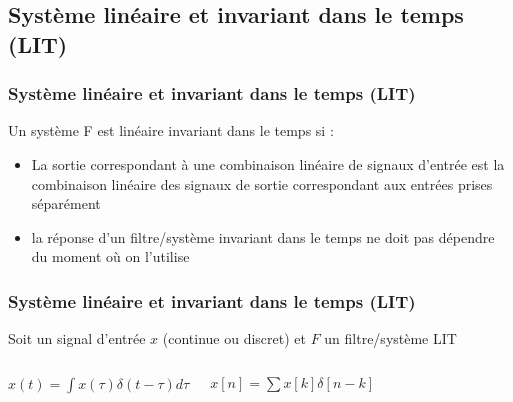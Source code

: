 \documentclass{beamer}
\begin{document}
\subsection{Système linéaire et invariant dans le  temps (LIT)}

\begin{frame}
\frametitle{Système linéaire et invariant dans le  temps (LIT) }

Un système F est linéaire invariant dans le temps si :
\begin{itemize}
\item La sortie correspondant à une combinaison linéaire de signaux d'entrée est la combinaison linéaire des signaux de sortie correspondant aux entrées prises séparément\\
\item la réponse d'un filtre/système invariant dans le temps ne doit pas dépendre du moment où on l'utilise\\
\end{itemize}

\end{frame} 

\begin{frame} 
\frametitle{Système linéaire et invariant dans le temps (LIT) }
Soit un signal d'entrée $x$ (continue ou discret) et $F$ un filtre/système LIT\\
\vspace{1 cm}
\begin{columns}
\column{65mm}
\begin{center}
$x(t) = \displaystyle \int x(\tau) \delta(t-\tau) d\tau$\\

\end{center}

\column{55mm}
\begin{center}
$x[n] =  \displaystyle \sum x[k] \delta[n-k] $ \\
\vspace{0.5cm}



\end{center}
\end{columns}
\end{frame}
\end{document}
